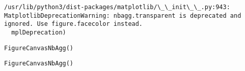 \documentclass[11pt]{article}
\begin{document}
    \begin{Verbatim}[commandchars=\\\{\}]
/usr/lib/python3/dist-packages/matplotlib/\_\_init\_\_.py:943: MatplotlibDeprecationWarning: nbagg.transparent is deprecated and ignored. Use figure.facecolor instead.
  mplDeprecation)

    \end{Verbatim}

    
    \begin{verbatim}
FigureCanvasNbAgg()
    \end{verbatim}

    
    
    \begin{verbatim}
FigureCanvasNbAgg()
    \end{verbatim}
\end{document}
